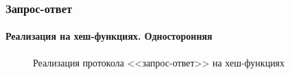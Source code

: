 \begin{frame}
\frametitle{Запрос-ответ}
\framesubtitle{Реализация на хеш-функциях. Односторонняя}
\begin{figure}
    \begin{center}
    \end{center}
    \caption{Реализация протокола <<запрос-ответ>> на хеш-функциях}\label{pict:chalresphash}
\end{figure} 
\end{frame}


